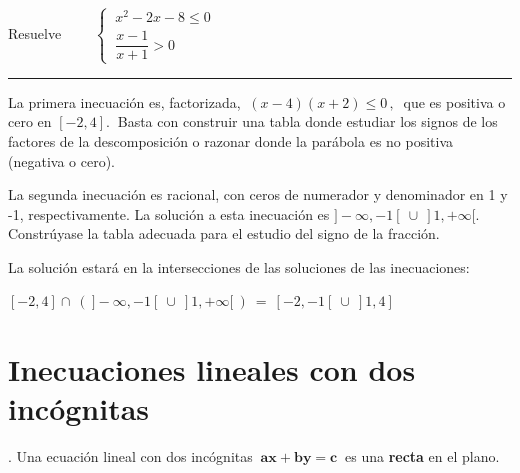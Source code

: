 \begin{miejercicio}

Resuelve $\qquad \begin{cases} \ x^2-2x-8\leqslant 0 \\ \ \dfrac{x-1}{x+1} > 0 \end{cases}$	

\vspace{2mm}

\rule{250pt}{0.5pt}

\vspace{5mm} La primera inecuación es, factorizada, $\ (x-4)(x+2)\leqslant 0\, , \  $ que es positiva o cero en $[-2,4].\ $ \textcolor{gris}{Basta con construir una tabla donde estudiar los signos de los factores de la descomposición o razonar donde la parábola es no positiva (negativa o cero).}

\vspace{4mm} La segunda inecuación es racional, con ceros de numerador y denominador en 1 y -1, respectivamente. La solución a esta inecuación es $]-\infty,-1[\ \cup\ ]1,+\infty[.\ $ \textcolor{gris}{Constrúyase la tabla adecuada para el estudio del signo de la fracción.}

\vspace{4mm} La solución estará en la intersecciones de las soluciones de las inecuaciones:

\vspace{2mm} $[-2,4] \cap \ \left( \ ]-\infty,-1[\ \cup\ ]1,+\infty[ \ \right) \ = \ [-2,-1[ \ \cup \ ]1,4]$

\vspace{2mm} 	
\end{miejercicio}

\vspace{1cm}
\section{Inecuaciones lineales con dos incógnitas}
\vspace{0.5cm}



\begin{theorem}
.	Una ecuación lineal con dos incógnitas $ \ \boldsymbol{ax+by=c} \ $ es una \textbf{recta} en el plano.
\end{theorem}

